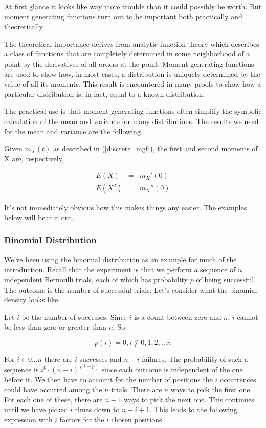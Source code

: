\documentclass[]{article}
\begin{document}
At first glance it looks like way more trouble than it could
possibly be worth.  But moment generating functions turn out
to be important both practically and theoretically.

The theoretical importance derives from analytic function
theory which describes a class of functions that are completely
determined in some neighborhood of a point by the derivatives 
of all orders at the point.  Moment generating functions are
used to show how, in most cases, a distribution is uniquely
determined by the value of all its moments.  This result
is encountered in many proofs to show how a particular
distribution is, in fact, equal to a known distribution.

The practical use is that moment generating functions
often simplify the symbolic calculation of the mean and
variance for many distributions.  The results we need
for the mean and variance are the following.

Given $m_X(t)$ as described in (\ref{discrete_mgf}), the
first and second moments of X are, respectively,

\begin{eqnarray}
E(X) & = & m_X'(0) \label{discrete_mgt_d1} \\
E(X^2) & = & m_X''(0) \label{discrete_mgt_d2}
\end{eqnarray}

It's not immediately obvious how this makes things any
easier.  The examples below will bear it out.

\subsubsection{Binomial Distribution}

We've been using the binomial distribution as an example
for much of the introduction.  Recall that the experiment is that
we perform a sequence of $n$ independent Bernoulli trials, each
of which has probability $p$ of being successful.  The outcome is
the number of successful trials.  Let's consider what the
binomial density looks like.

Let $i$ be the number of successes.  Since $i$ is a count between
zero and $n$, $i$ cannot be less than zero or greater than $n$.  So

$$
p(i) = 0, i \not\in 0, 1, 2, \ldots n
$$

For $i \in 0 \ldots n$ there are $i$ successes and $n-i$ failures.
The probability of such a sequence is $i^p \cdot (n-i)^{(1-p)}$
since each outcome is independent of the one before it.  We then
have to account for the number of positions the $i$ occurrences
could have occurred among the $n$ trials.  There are $n$ ways to
pick the first one.  For each one of these, there are $n-1$ ways
to pick the next one.  This continues until we have picked $i$
times down to $n-i+1$.  This leads to the following expression
with $i$ factors for the $i$ chosen positions.
\end{document}
